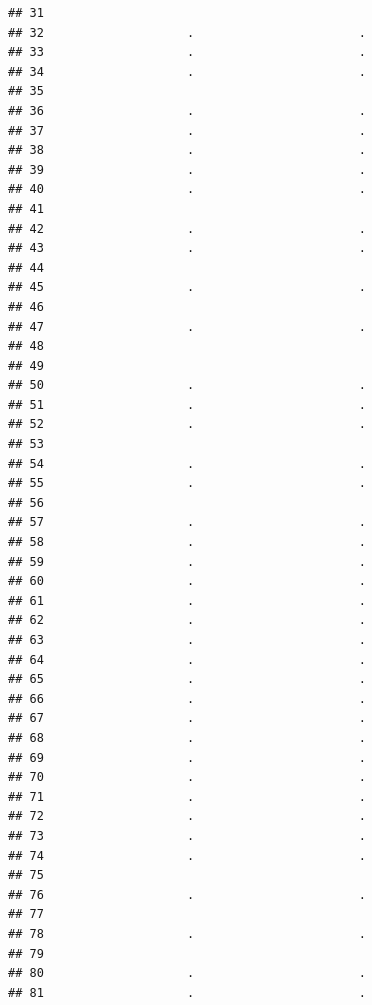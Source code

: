 \documentclass[
]{article}
\begin{document}
\begin{verbatim}
## 31                                             
## 32                    .                       .
## 33                    .                       .
## 34                    .                       .
## 35                                             
## 36                    .                       .
## 37                    .                       .
## 38                    .                       .
## 39                    .                       .
## 40                    .                       .
## 41                                             
## 42                    .                       .
## 43                    .                       .
## 44                                             
## 45                    .                       .
## 46                                             
## 47                    .                       .
## 48                                             
## 49                                             
## 50                    .                       .
## 51                    .                       .
## 52                    .                       .
## 53                                             
## 54                    .                       .
## 55                    .                       .
## 56                                             
## 57                    .                       .
## 58                    .                       .
## 59                    .                       .
## 60                    .                       .
## 61                    .                       .
## 62                    .                       .
## 63                    .                       .
## 64                    .                       .
## 65                    .                       .
## 66                    .                       .
## 67                    .                       .
## 68                    .                       .
## 69                    .                       .
## 70                    .                       .
## 71                    .                       .
## 72                    .                       .
## 73                    .                       .
## 74                    .                       .
## 75                                             
## 76                    .                       .
## 77                                             
## 78                    .                       .
## 79                                             
## 80                    .                       .
## 81                    .                       .

\end{verbatim}
\end{document}
